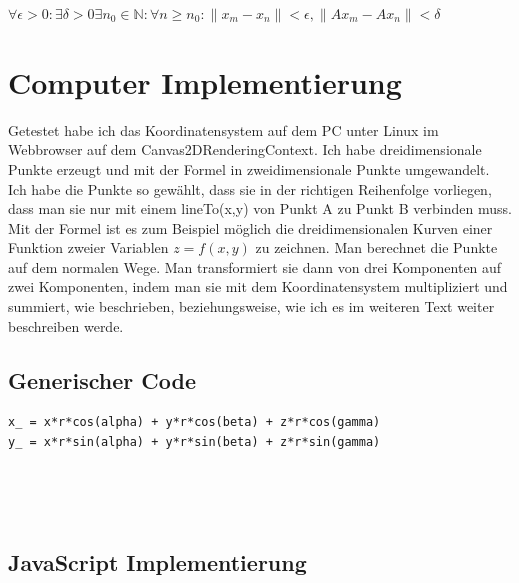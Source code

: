 \documentclass[a4paper]{article}
\begin{document}
$\forall \epsilon > 0 : \exists \delta > 0 \exists n_{0} \in \mathbb{N} : \forall n \geq n_{0} : \|x_{m}-x_{n}\| < \epsilon, \|Ax_m - Ax_n\| < \delta$


\section{Computer Implementierung}

Getestet habe ich das Koordinatensystem auf dem PC unter Linux im Webbrowser auf dem Canvas2DRenderingContext. Ich habe dreidimensionale Punkte erzeugt und mit der Formel in zweidimensionale Punkte umgewandelt. Ich habe die Punkte so gew\"ahlt,
dass sie in der richtigen Reihenfolge vorliegen, dass man sie nur mit einem lineTo(x,y) von Punkt A zu Punkt B verbinden muss.\\


Mit der Formel ist es zum Beispiel m\"oglich die dreidimensionalen Kurven einer Funktion zweier Variablen $z=f(x,y)$ zu zeichnen.
Man berechnet die Punkte auf dem normalen Wege. Man transformiert sie dann von drei Komponenten auf zwei Komponenten, indem man sie
mit dem Koordinatensystem multipliziert und summiert, wie beschrieben, beziehungsweise, wie ich es im weiteren Text weiter beschreiben werde.\\


\subsection{Generischer Code}

\begin{example}
\begin{lstlisting}
x_ = x*r*cos(alpha) + y*r*cos(beta) + z*r*cos(gamma)
y_ = x*r*sin(alpha) + y*r*sin(beta) + z*r*sin(gamma)
\end{lstlisting}\\

\end{example}\\

\subsection{JavaScript Implementierung}
\end{document}

